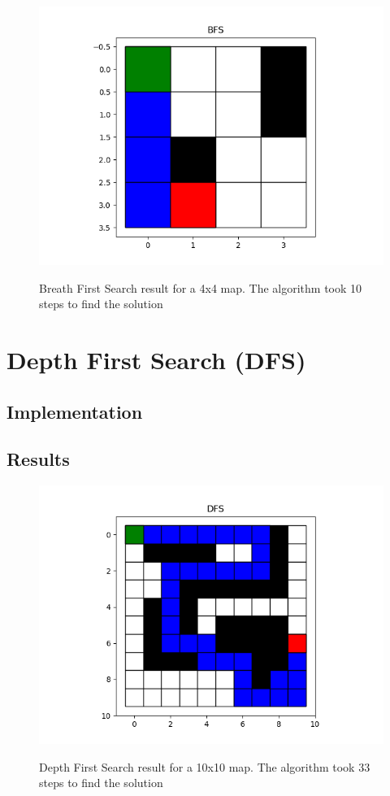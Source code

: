 \documentclass[journal]{IEEEtran}
\begin{document}
    \begin{figure}[ht]
        \includegraphics[width=\linewidth]{figures/BFS_SmallMap_Path.png}
        \label{fig:Dijkstra_Weights_Example}
        \caption{Breath First Search result for a 4x4 map. The algorithm took 10 steps to find the solution}
    \end{figure} 

    \section{Depth First Search (DFS)} \label{DFS}

    \subsection{Implementation}
    
    \subsection{Results}

    \begin{figure}[ht]
        \includegraphics[width=\linewidth]{figures/DFS_LargeMap_Path.png}
        \label{fig:Dijkstra_Weights_Example}
        \caption{Depth First Search result for a 10x10 map. The algorithm took 33 steps to find the solution}
    \end{figure} 
\end{document}

